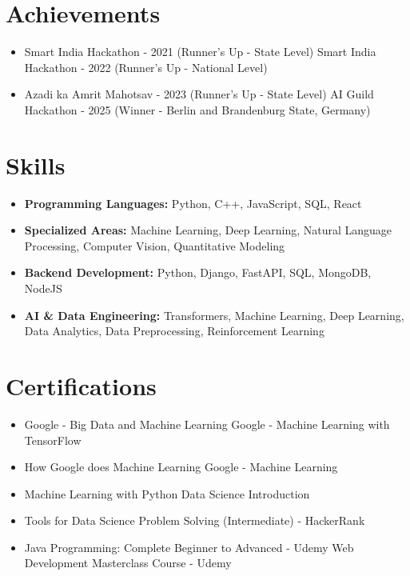 \documentclass[a4paper,10pt]{article}
\begin{document}
\section*{Achievements}
\begin{itemize}
\item Smart India Hackathon - 2021 (Runner's Up - State Level) \hfill Smart India Hackathon - 2022 (Runner's Up - National Level)
\item Azadi ka Amrit Mahotsav - 2023 (Runner's Up - State Level) \hfill AI Guild Hackathon - 2025 (Winner - Berlin and Brandenburg State, Germany)
\end{itemize}

\section*{Skills}
\begin{itemize}
  \item \textbf{Programming Languages:} Python, C++, JavaScript, SQL, React
  \item \textbf{Specialized Areas:} Machine Learning, Deep Learning, Natural Language Processing, Computer Vision, Quantitative Modeling
  \item \textbf{Backend Development:} Python, Django, FastAPI, SQL, MongoDB, NodeJS
  \item \textbf{AI \& Data Engineering:} Transformers, Machine Learning, Deep Learning, Data Analytics, Data Preprocessing, Reinforcement Learning
\end{itemize}

\section*{Certifications}
\begin{itemize}
\item Google - Big Data and Machine Learning \hfill Google - Machine Learning with TensorFlow
\item How Google does Machine Learning \hfill Google - Machine Learning
\item Machine Learning with Python \hfill Data Science Introduction
\item Tools for Data Science \hfill Problem Solving (Intermediate) - HackerRank
\item Java Programming: Complete Beginner to Advanced - Udemy \hfill Web Development Masterclass Course - Udemy
\end{itemize}
\end{document}
